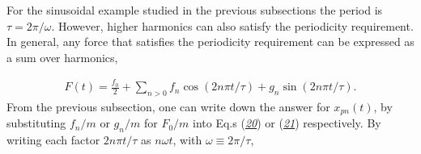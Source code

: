 \documentclass[letterpaper,10pt,english]{sphinxmanual}
\begin{document}
\begin{sphinxVerbatim}[commandchars=\\\{\}]
   
 
   
   

  
  
  
     
  
  
 
 
\end{sphinxVerbatim}

For the sinusoidal example studied in the previous subsections the
period is \(\tau=2\pi/\omega\). However, higher harmonics can also
satisfy the periodicity requirement. In general, any force that
satisfies the periodicity requirement can be expressed as a sum over
harmonics,




\begin{equation*}
\begin{split}
\begin{equation}
F(t)=\frac{f_0}{2}+\sum_{n>0} f_n\cos(2n\pi t/\tau)+g_n\sin(2n\pi t/\tau).
\label{_auto26} \tag{35}
\end{equation}
\end{split}
\end{equation*}
From the previous subsection, one can write down the answer for
\(x_{pn}(t)\), by substituting \(f_n/m\) or \(g_n/m\) for \(F_0/m\) into Eq.s
({\hyperref[\detokenize{chapter4:eq:fastdriven1}]{\emph{20}}}) or ({\hyperref[\detokenize{chapter4:eq:fastdriven2}]{\emph{21}}}) respectively. By
writing each factor \(2n\pi t/\tau\) as \(n\omega t\), with \(\omega\equiv
2\pi/\tau\),
\end{document}

